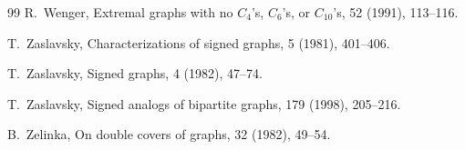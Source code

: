 \documentclass{article}
\theoremstyle{definition}
\theoremstyle{remark}
\begin{document}
\begin{thebibliography}{99}
R.~Wenger,
\newblock Extremal graphs with no $C_4$'s, $C_6$'s, or $C_{10}$'s,
 52 (1991), 113--116.

T.~Zaslavsky,
\newblock Characterizations of signed graphs,
 5 (1981), 401--406.

T.~Zaslavsky,
\newblock Signed graphs,
 4 (1982), 47--74.

T.~Zaslavsky,
\newblock Signed analogs of bipartite graphs,
 179 (1998), 205--216.

B.~Zelinka,
\newblock On double covers of graphs,
 32 (1982), 49--54.

\end{thebibliography}
\end{document}
